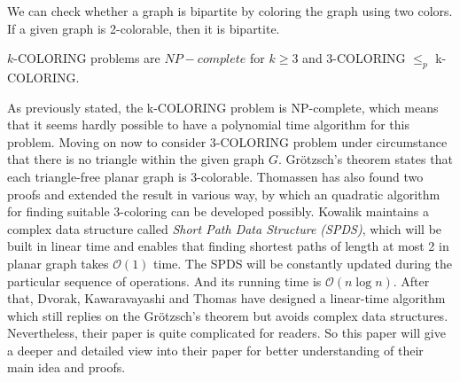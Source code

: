 \begin{observation}
We can check whether a graph is bipartite by coloring the graph using two colors. If a given graph is 2-colorable, then it is bipartite.
\end{observation}

\begin{observation}
$k$-COLORING problems are $NP-complete$ for $k \geq 3$ and 3-COLORING $\le_p$ k-COLORING. 
\end{observation}

As previously stated, the k-COLORING problem is NP-complete, which means that it seems hardly possible to have a polynomial time algorithm for this problem. Moving on now to consider 3-COLORING problem under circumstance that there is no triangle within the given graph $G$. Grötzsch’s theorem \cite{grotzsch1959dreifarbensatz} states that each triangle-free planar graph is 3-colorable. Thomassen \cite{Thomassen1994Grtzschs3T} has also found two proofs and extended the result in various way, by which an quadratic algorithm for finding suitable 3-coloring can be developed possibly. Kowalik \cite{article} maintains a complex data structure called \textit{Short Path Data Structure (SPDS)}, which will be built in linear time and enables that finding shortest paths of length at most 2 in planar graph takes $\mathcal{O}(1)$ time. The SPDS will be constantly updated during the particular sequence of operations. And its running time is $\mathcal{O}(n\log{}n)$. After that, Dvorak, Kawaravayashi and Thomas \cite{dvorak2013threecoloring} have designed a linear-time algorithm which still replies on the Grötzsch’s theorem but avoids complex data structures. Nevertheless, their paper is quite complicated for readers. So this paper will give a deeper and detailed view into their paper for better understanding of their main idea and proofs. 
